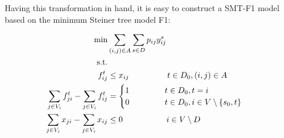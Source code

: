 
Having this transformation in hand, it is easy to construct a SMT-F1 model based on the minimum Steiner tree model F1:

    \begin{subequations}
    \begin{flalign}
  \min &  \sum\limits_{(i,j) \in A} \sum\limits_{s \in D} p_{ij} y^s_{ij}    \\  \notag  
		   \text{s.t.}&                  && \\	\ 
\label{con:pf1:xfrel}  f^{t}_{ij}   &\leq x_{ij}    ~~ \qquad \qquad t\in D_0, (i,j)\in A \\
 \label{con:pf1:flow}  \sum\limits_{\substack{ j \in V_i }}f^{t}_{ji}-\sum\limits_{\substack{j\in V_i}}f^{t}_{ij}    & = \begin{cases}
    1~~~~&  t\in D_0, t = i \\        0~~~~ \qquad             & t\in D_0, i\in V\setminus \{s_0, t\}\end{cases}     \\	
 \label{con:pf1:flowX}  \sum\limits_{\substack{ j\in V_i }}x_{ji}-\sum\limits_{\substack{j\in V_i}}x_{ij}    & \leq 0~~~~    \qquad\qquad			  i\in V\setminus D \\			 			   	

\end{flalign}
\end{subequations}
